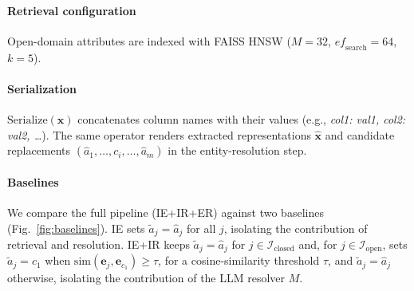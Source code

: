 \documentclass[conference]{IEEEtran}
\begin{document}
\paragraph{Retrieval configuration}
Open-domain attributes are indexed with FAISS HNSW ($M = 32$,
$\mathit{ef}_{\mathrm{search}} = 64$, $k = 5$).

\paragraph{Serialization}
$\text{Serialize}(\mathbf{x})$ concatenates column names with their
values (e.g., \textit{col1: val1, col2: val2, \dots}). The same
operator renders extracted representations $\hat{\mathbf{x}}$ and
candidate replacements $(\hat{a}_1, \dots, c_i, \dots, \hat{a}_m)$ in
the entity-resolution step.

\paragraph{Baselines}
We compare the full pipeline (IE+IR+ER) against two baselines
(Fig.~\ref{fig:baselines}).
IE sets $\tilde{a}_j = \hat{a}_j$ for all $j$, isolating the
contribution of retrieval and resolution. IE+IR keeps $\tilde{a}_j =
\hat{a}_j$ for $j \in \mathcal{I}_{\text{closed}}$ and, for $j \in
\mathcal{I}_{\text{open}}$, sets $\tilde{a}_j = c_1$ when
$\text{sim}(\mathbf{e}_j, \mathbf{e}_{c_1}) \geq \tau$, for a
cosine-similarity threshold $\tau$, and $\tilde{a}_j = \hat{a}_j$
otherwise, isolating the contribution of the LLM resolver $M$.
\end{document}
